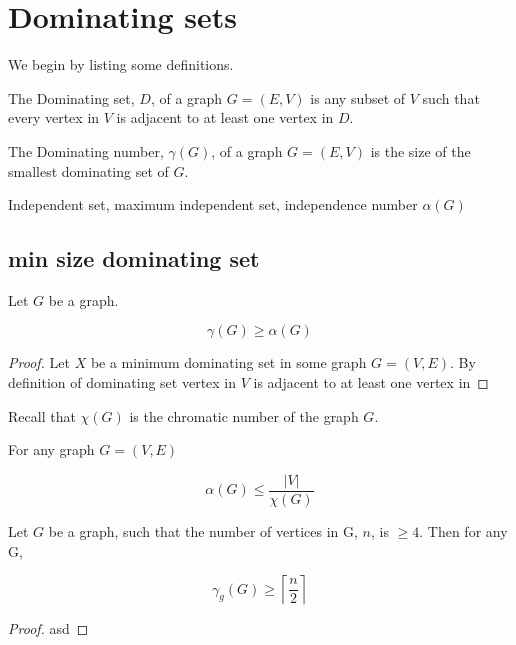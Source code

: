 \chapter{Dominating sets}

We begin by listing some definitions.

\begin{definition}
    The Dominating set, $D$, of a graph $G=(E,V)$ is any subset of $V$ such that every vertex in $V$ is adjacent to at least one vertex in $D$.
\end{definition}

\begin{definition}
    The Dominating number, $\gamma(G)$, of a graph $G=(E,V)$ is the size of the smallest dominating set of $G$.
\end{definition}

\begin{definition}
    Independent set, maximum independent set, independence number $\alpha(G)$
\end{definition}

\section{min size dominating set}

\begin{lemma}
    Let $G$ be a graph. 
        
    \[\gamma(G) \geq \alpha(G)\]
     
\end{lemma}

\begin{proof}
    
    Let $X$ be a minimum dominating set in some graph $G=(V,E)$. By definition of dominating set vertex in $V$ is adjacent to at least one vertex in      
   
\end{proof}
    
Recall that $\chi(G)$ is the chromatic number of the graph $G$.

\begin{theorem}  
For any graph $G = (V,E)$ \cite{Willis2011BoundsFT}

    \[\alpha(G) \leq \frac{ \left | {V} \right |}{\chi(G)}\]


\end{theorem}

\begin{theorem} \label{minDomSize}
    Let $G$ be a graph, such that the number of vertices in G, $n$, is $\geq 4$. Then for any G,
    
    \[ \gamma_g(G) \geq \left \lceil{\frac{n}{2}}\right \rceil \]
    
\end{theorem}

\begin{proof}
asd    
\end{proof}
